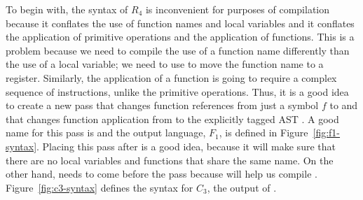 \documentclass[11pt]{book}
\begin{document}
To begin with, the syntax of $R_4$ is inconvenient for purposes of
compilation because it conflates the use of function names and local
variables and it conflates the application of primitive operations and
the application of functions. This is a problem because we need to
compile the use of a function name differently than the use of a local
variable; we need to use  to move the function name to a
register. Similarly, the application of a function is going to require
a complex sequence of instructions, unlike the primitive
operations. Thus, it is a good idea to create a new pass that changes
function references from just a symbol $f$ to  and that changes function application from  to the explicitly tagged AST . A good name for this pass is
 and the output language, $F_1$, is defined in
Figure~\ref{fig:f1-syntax}. Placing this pass after  is
a good idea, because it will make sure that there are no local
variables and functions that share the same name. On the other hand,
 needs to come before the  pass
because  will help us compile .
Figure~\ref{fig:c3-syntax} defines the syntax for $C_3$, the output of
.
\end{document}

